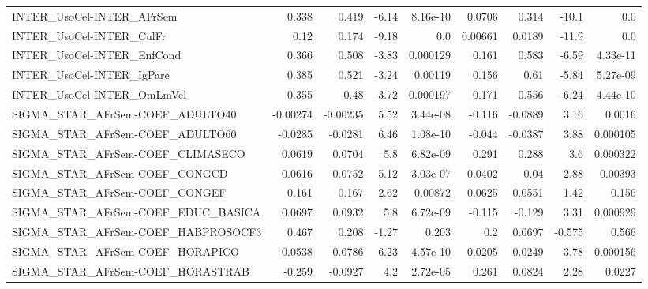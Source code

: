 \begin{tabular}{lrrrrrrrr}
INTER\_UsoCel-INTER\_AFrSem             &       0.338 &        0.419 &    -6.14 & 8.16e-10 &     0.0706 &       0.314 &        -10.1 &           0.0 \\
INTER\_UsoCel-INTER\_CulFr              &        0.12 &        0.174 &    -9.18 &      0.0 &    0.00661 &      0.0189 &        -11.9 &           0.0 \\
INTER\_UsoCel-INTER\_EnfCond            &       0.366 &        0.508 &    -3.83 & 0.000129 &      0.161 &       0.583 &        -6.59 &      4.33e-11 \\
INTER\_UsoCel-INTER\_IgPare             &       0.385 &        0.521 &    -3.24 &  0.00119 &      0.156 &        0.61 &        -5.84 &      5.27e-09 \\
INTER\_UsoCel-INTER\_OmLmVel            &       0.355 &         0.48 &    -3.72 & 0.000197 &      0.171 &       0.556 &        -6.24 &      4.44e-10 \\
SIGMA\_STAR\_AFrSem-COEF\_ADULTO40       &    -0.00274 &     -0.00235 &     5.52 & 3.44e-08 &     -0.116 &     -0.0889 &         3.16 &        0.0016 \\
SIGMA\_STAR\_AFrSem-COEF\_ADULTO60       &     -0.0285 &      -0.0281 &     6.46 & 1.08e-10 &     -0.044 &     -0.0387 &         3.88 &      0.000105 \\
SIGMA\_STAR\_AFrSem-COEF\_CLIMASECO      &      0.0619 &       0.0704 &      5.8 & 6.82e-09 &      0.291 &       0.288 &          3.6 &      0.000322 \\
SIGMA\_STAR\_AFrSem-COEF\_CONGCD         &      0.0616 &       0.0752 &     5.12 & 3.03e-07 &     0.0402 &        0.04 &         2.88 &       0.00393 \\
SIGMA\_STAR\_AFrSem-COEF\_CONGEF         &       0.161 &        0.167 &     2.62 &  0.00872 &     0.0625 &      0.0551 &         1.42 &         0.156 \\
SIGMA\_STAR\_AFrSem-COEF\_EDUC\_BASICA    &      0.0697 &       0.0932 &      5.8 & 6.72e-09 &     -0.115 &      -0.129 &         3.31 &      0.000929 \\
SIGMA\_STAR\_AFrSem-COEF\_HABPROSOCF3    &       0.467 &        0.208 &    -1.27 &    0.203 &        0.2 &      0.0697 &       -0.575 &         0.566 \\
SIGMA\_STAR\_AFrSem-COEF\_HORAPICO       &      0.0538 &       0.0786 &     6.23 & 4.57e-10 &     0.0205 &      0.0249 &         3.78 &      0.000156 \\
SIGMA\_STAR\_AFrSem-COEF\_HORASTRAB      &      -0.259 &      -0.0927 &      4.2 & 2.72e-05 &      0.261 &      0.0824 &         2.28 &        0.0227 \\

\end{tabular}

